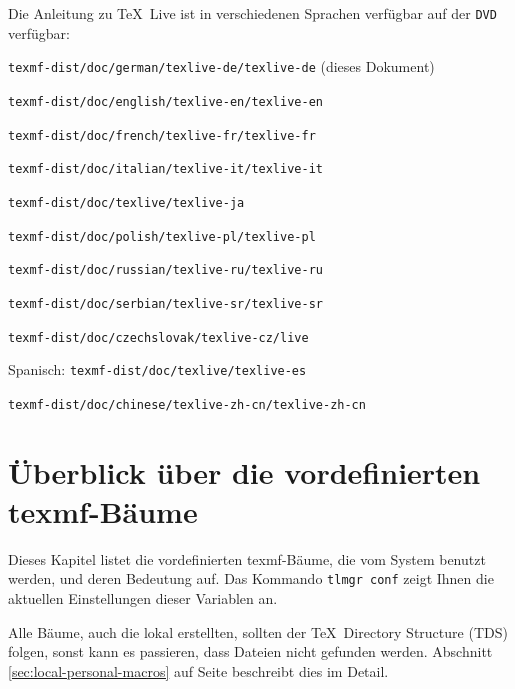 \documentclass[12pt,ngerman,a4paper,fullparskip]{report}
\newcommand{\TL}{\TeX\ Live\xspace}
\newcommand{\acro}[1]{\texttt{#1}}
\newcommand{\OnCD}[1]{\texttt{#1}}
\providecommand*{\DVD}{\acro{DVD}\xspace}
\begin{document}
Die Anleitung zu \TL ist in verschiedenen Sprachen verfügbar auf der \DVD verfügbar:
\begin{description}
\item[Deutsch:]                \OnCD{texmf-dist/doc/german/texlive-de/texlive-de} (dieses Dokument)
\item[Englisch:]               \OnCD{texmf-dist/doc/english/texlive-en/texlive-en}
\item[Französisch:]            \OnCD{texmf-dist/doc/french/texlive-fr/texlive-fr}
\item[Italienisch:]              \OnCD{texmf-dist/doc/italian/texlive-it/texlive-it}
\item[Japanisch:]  					\OnCD{texmf-dist/doc/texlive/texlive-ja}
\item[Polnisch:]               \OnCD{texmf-dist/doc/polish/texlive-pl/texlive-pl}
\item[Russisch:]               \OnCD{texmf-dist/doc/russian/texlive-ru/texlive-ru}
\item[Serbisch:]               \OnCD{texmf-dist/doc/serbian/texlive-sr/texlive-sr}
\item[Tschechisch/Slowakisch:] \OnCD{texmf-dist/doc/czechslovak/texlive-cz/live}
\item{Spanisch:} \OnCD{texmf-dist/doc/texlive/texlive-es}
\item[Chinesisch:]             \OnCD{texmf-dist/doc/chinese/texlive-zh-cn/texlive-zh-cn}
\end{description}

\section{Überblick über die vordefinierten texmf-Bäume}\label{sec:texmftrees}

Dieses Kapitel listet die vordefinierten texmf-Bäume, die vom System benutzt
werden, und deren Bedeutung auf. Das Kommando \texttt{tlmgr~conf}
zeigt Ihnen die aktuellen Einstellungen dieser Variablen an.

Alle Bäume, auch die lokal erstellten, sollten der \TeX\ Directory Structure (TDS) folgen, sonst kann es passieren, dass Dateien nicht gefunden werden. Abschnitt \ref{sec:local-personal-macros} auf Seite \pageref{sec:local-personal-macros} beschreibt dies im Detail.
\end{document}
